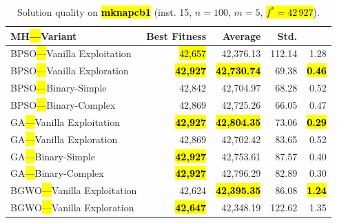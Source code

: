 \documentclass[mathematics,article,accept,moreauthors]{Definitions/mdpi}
\begin{document}
\begin{table}[H]
  \small
  \caption{Solution quality on \textbf{\hl{mknapcb1}} (inst. 15, $n=100$, $m=5$, \hl{$f^*=42\,927$}).} %
  \label{tab:calidad_mknapcb1_15}
  \begin{tabularx}{\textwidth}{lRRRR}
    \toprule
    \textbf{MH\hl{---}Variant} &
    \textbf{Best Fitness} &
    \textbf{Average} &
    \textbf{Std.} &
    \textbf{} \\
    \midrule
    BPSO\hl{---}Vanilla Exploitation &          \hl{42,657} %
 &         42,376.13 & 112.14 &         1.28 \\
    BPSO\hl{---}Vanilla Exploration  & \textbf{\hl{42,927}} & \textbf{\hl{42,730.74}} &  69.38 & \textbf{\hl{0.46}} \\
    BPSO\hl{---}Binary-Simple        &          42,842 &         42,704.97 &  68.28 &         0.52 \\
    BPSO\hl{---}Binary-Complex       &          42,869 &         42,725.26 &  66.05 &         0.47 \\
    \midrule
    GA\hl{---}Vanilla Exploitation   & \textbf{\hl{42,927}} & \textbf{\hl{42,804.35}} &  73.06 & \textbf{\hl{0.29}} \\
    GA\hl{---}Vanilla Exploration    &          42,869 &         42,702.42 &  83.65 &         0.52 \\
    GA\hl{---}Binary-Simple          & \textbf{\hl{42,927}} &         42,753.61 &  87.57 &         0.40 \\
    GA\hl{---}Binary-Complex         & \textbf{\hl{42,927}} &         42,796.29 &  82.89 &         0.30 \\
    \midrule
    BGWO\hl{---}Vanilla Exploitation &          42,624 & \textbf{\hl{42,395.35}} &  86.08 & \textbf{\hl{1.24}} \\
    BGWO\hl{---}Vanilla Exploration  & \textbf{\hl{42,647}} &         42,348.19 & 122.62 &         1.35 \\

\end{tabularx}
\end{table}
\end{document}
